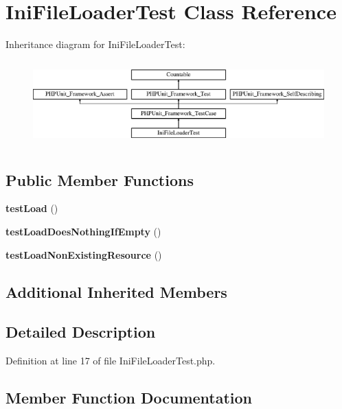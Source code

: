 \section{Ini\+File\+Loader\+Test Class Reference}
\label{class_symfony_1_1_component_1_1_translation_1_1_tests_1_1_loader_1_1_ini_file_loader_test}
Inheritance diagram for Ini\+File\+Loader\+Test\+:\begin{figure}[H]
\begin{center}
\leavevmode
\includegraphics[height=3.303835cm]{class_symfony_1_1_component_1_1_translation_1_1_tests_1_1_loader_1_1_ini_file_loader_test}
\end{center}
\end{figure}
\subsection*{Public Member Functions}
\begin{DoxyCompactItemize}
\item 
{\bf test\+Load} ()
\item 
{\bf test\+Load\+Does\+Nothing\+If\+Empty} ()
\item 
{\bf test\+Load\+Non\+Existing\+Resource} ()
\end{DoxyCompactItemize}
\subsection*{Additional Inherited Members}


\subsection{Detailed Description}


Definition at line 17 of file Ini\+File\+Loader\+Test.\+php.



\subsection{Member Function Documentation}
